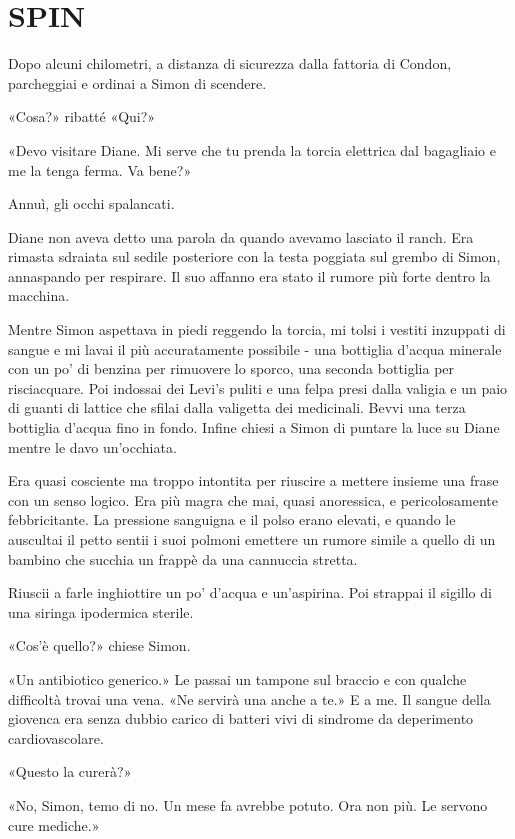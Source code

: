 \chapter{SPIN}\label{spin}

\hfill\break

Dopo alcuni chilometri, a distanza di sicurezza dalla fattoria di
Condon, parcheggiai e ordinai a Simon di scendere.

«Cosa?» ribatté «Qui?»

«Devo visitare Diane. Mi serve che tu prenda la torcia elettrica dal
bagagliaio e me la tenga ferma. Va bene?»

Annuì, gli occhi spalancati.

Diane non aveva detto una parola da quando avevamo lasciato il ranch.
Era rimasta sdraiata sul sedile posteriore con la testa poggiata sul
grembo di Simon, annaspando per respirare. Il suo affanno era stato il
rumore più forte dentro la macchina.

Mentre Simon aspettava in piedi reggendo la torcia, mi tolsi i vestiti
inzuppati di sangue e mi lavai il più accuratamente possibile - una
bottiglia d'acqua minerale con un po' di benzina per rimuovere lo
sporco, una seconda bottiglia per risciacquare. Poi indossai dei Levi's
puliti e una felpa presi dalla valigia e un paio di guanti di lattice
che sfilai dalla valigetta dei medicinali. Bevvi una terza bottiglia
d'acqua fino in fondo. Infine chiesi a Simon di puntare la luce su Diane
mentre le davo un'occhiata.

Era quasi cosciente ma troppo intontita per riuscire a mettere insieme
una frase con un senso logico. Era più magra che mai, quasi anoressica,
e pericolosamente febbricitante. La pressione sanguigna e il polso erano
elevati, e quando le auscultai il petto sentii i suoi polmoni emettere
un rumore simile a quello di un bambino che succhia un frappè da una
cannuccia stretta.

Riuscii a farle inghiottire un po' d'acqua e un'aspirina. Poi strappai
il sigillo di una siringa ipodermica sterile.

«Cos'è quello?» chiese Simon.

«Un antibiotico generico.» Le passai un tampone sul braccio e con
qualche difficoltà trovai una vena. «Ne servirà una anche a te.» E a me.
Il sangue della giovenca era senza dubbio carico di batteri vivi di
sindrome da deperimento cardiovascolare.

«Questo la curerà?»

«No, Simon, temo di no. Un mese fa avrebbe potuto. Ora non più. Le
servono cure mediche.»

